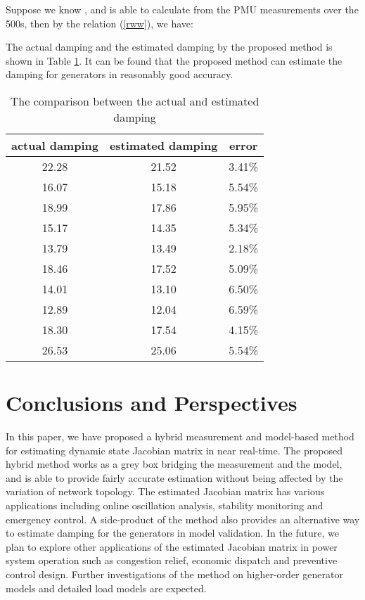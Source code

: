\documentclass[journal]{IEEEtran}
\begin{document}
Suppose we know , and is able to calculate  from the PMU measurements over the 500s, then by the relation (\ref{rww}), we have:


The actual damping and the estimated damping by the proposed method is shown in Table \ref{39-dampingtable}. It can be found that the proposed method can estimate the damping for generators in reasonably good accuracy.
\begin{table}[!ht]
\centering
\caption{The comparison between the actual and estimated damping}\label{39-dampingtable}
\begin{tabular}{|c|c|c|}
\hline
actual damping&estimated damping&error\\
\hline
22.28&21.52&3.41\%\\
\hline
16.07&15.18&5.54\%\\
\hline
18.99&17.86&5.95\%\\
\hline
15.17&14.35&5.34\%\\
\hline
13.79&13.49&2.18\%\\
\hline
18.46&17.52&5.09\%\\
\hline
14.01&13.10&6.50\%\\
\hline
12.89&12.04&6.59\%\\
\hline
18.30&17.54&4.15\%\\
\hline
26.53&25.06&5.54\%\\
\hline
\end{tabular}
\end{table}


\section{Conclusions and Perspectives}\label{sectionconclusion}

In this paper, we have proposed a hybrid measurement and model-based method for estimating dynamic state Jacobian matrix in near real-time. The proposed hybrid method works as a grey box bridging the measurement and the model, and is able to provide fairly accurate estimation without being affected by the variation of network topology. The estimated Jacobian matrix has various applications including online oscillation analysis, stability monitoring and emergency control. A side-product of the method also provides an alternative way to estimate damping for the generators in model validation. In the future, we plan to explore other applications of the estimated Jacobian matrix in power system operation such as congestion relief, economic dispatch and preventive control design. Further investigations of the method on higher-order generator models and detailed load models are expected. 
\appendices
\end{document}
